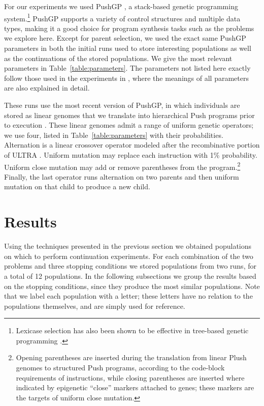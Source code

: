 \documentclass{sig-alternate-05-2015}
\begin{document}
For our experiments we used PushGP \cite{spector:2002:GPEM, 1068292}, a stack-based genetic programming system.\footnote{Lexicase selection has also been shown to be effective in tree-based genetic programming \cite{Helmuth:2015:ieeeTEC, Krawiec:2015:GECCO:smgpWorkshop}.} PushGP supports a variety of control structures and multiple data types, making it a good choice for program synthesis tasks such as the problems we explore here.
Except for parent selection, we used the exact same PushGP parameters in both the initial runs used to store interesting populations as well as the continuations of the stored populations. We give the most relevant parameters in Table~\ref{table:parameters}. The parameters not listed here exactly follow those used in the experiments in \cite{Helmuth:2015:dissertation}, where the meanings of all parameters are also explained in detail.

These runs use the most recent version of PushGP, in which individuals are stored as linear genomes that we translate into hierarchical Push programs prior to execution \cite{Helmuth:2015:dissertation}. These linear genomes admit a range of uniform genetic operators; we use four, listed in Table~\ref{table:parameters} with their probabilities. Alternation is a linear crossover operator modeled after the recombinative portion of ULTRA \cite{Spector:2013:GPTP}. Uniform mutation may replace each instruction with 1\% probability. Uniform close mutation may add or remove parentheses from the program.\footnote{Opening parentheses are inserted during the translation from linear Plush genomes to structured Push programs, according to the code-block requirements of instructions, while closing parentheses are inserted where indicated by epigenetic ``close'' markers attached to genes; these markers are the targets of uniform close mutation.} Finally, the last operator runs alternation on two parents and then uniform mutation on that child to produce a new child.


\section{Results}
\label{sec:results}

Using the techniques presented in the previous section we obtained populations on which to perform continuation experiments. For each combination of the two problems and three stopping conditions we stored populations from two runs, for a total of 12 populations. In the following subsections we group the results based on the stopping conditions, since they produce the most similar populations. Note that we label each population with a letter; these letters have no relation to the populations themselves, and are simply used for reference.
\end{document}
